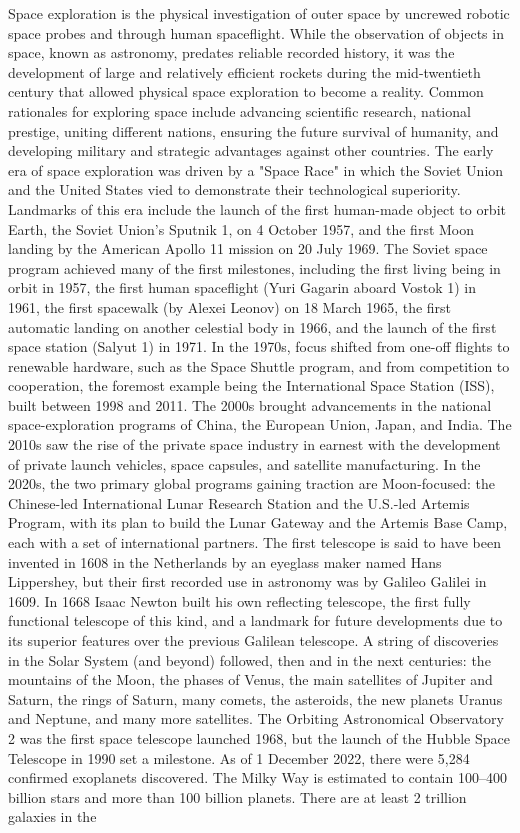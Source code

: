\documentclass[12pt]{article}
\begin{document}
Space exploration is the physical investigation of outer space by uncrewed robotic space probes and through human spaceflight. While the observation of objects in space, known as astronomy, predates reliable recorded history, it was the development of large and relatively efficient rockets during the mid-twentieth century that allowed physical space exploration to become a reality. Common rationales for exploring space include advancing scientific research, national prestige, uniting different nations, ensuring the future survival of humanity, and developing military and strategic advantages against other countries. The early era of space exploration was driven by a "Space Race" in which the Soviet Union and the United States vied to demonstrate their technological superiority. Landmarks of this era include the launch of the first human-made object to orbit Earth, the Soviet Union's Sputnik 1, on 4 October 1957, and the first Moon landing by the American Apollo 11 mission on 20 July 1969. The Soviet space program achieved many of the first milestones, including the first living being in orbit in 1957, the first human spaceflight (Yuri Gagarin aboard Vostok 1) in 1961, the first spacewalk (by Alexei Leonov) on 18 March 1965, the first automatic landing on another celestial body in 1966, and the launch of the first space station (Salyut 1) in 1971. In the 1970s, focus shifted from one-off flights to renewable hardware, such as the Space Shuttle program, and from competition to cooperation, the foremost example being the International Space Station (ISS), built between 1998 and 2011. The 2000s brought advancements in the national space-exploration programs of China, the European Union, Japan, and India. The 2010s saw the rise of the private space industry in earnest with the development of private launch vehicles, space capsules, and satellite manufacturing. In the 2020s, the two primary global programs gaining traction are Moon-focused: the Chinese-led International Lunar Research Station and the U.S.-led Artemis Program, with its plan to build the Lunar Gateway and the Artemis Base Camp, each with a set of international partners. The first telescope is said to have been invented in 1608 in the Netherlands by an eyeglass maker named Hans Lippershey, but their first recorded use in astronomy was by Galileo Galilei in 1609. In 1668 Isaac Newton built his own reflecting telescope, the first fully functional telescope of this kind, and a landmark for future developments due to its superior features over the previous Galilean telescope. A string of discoveries in the Solar System (and beyond) followed, then and in the next centuries: the mountains of the Moon, the phases of Venus, the main satellites of Jupiter and Saturn, the rings of Saturn, many comets, the asteroids, the new planets Uranus and Neptune, and many more satellites. The Orbiting Astronomical Observatory 2 was the first space telescope launched 1968, but the launch of the Hubble Space Telescope in 1990 set a milestone. As of 1 December 2022, there were 5,284 confirmed exoplanets discovered. The Milky Way is estimated to contain 100–400 billion stars and more than 100 billion planets. There are at least 2 trillion galaxies in the 
\end{document}
